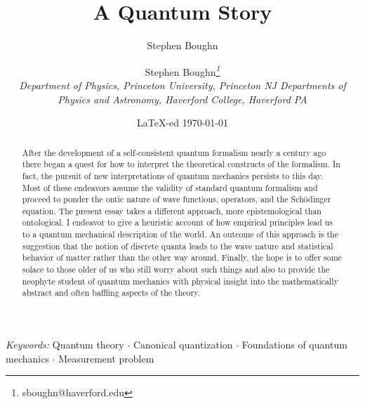 \documentclass[12pt]{article}
\def\\{\hfill\break} \let\==\equiv
\begin{document}
\title{A Quantum Story}
\author {Stephen Boughn{\small\it\thanks{sboughn@haverford.edu}}\author{Stephen Boughn}
\\[2mm]
 \it Department of Physics, Princeton University, Princeton NJ\\
 \it Departments of Physics and Astronomy, Haverford College, Haverford PA}


\date{{\small   \LaTeX-ed \today}}

\maketitle


\begin{abstract}

After the development of a self-consistent quantum formalism nearly a century ago there began a quest for how to interpret the theoretical constructs of the formalism.  In fact, the pursuit of new interpretations of quantum mechanics persists to this day.  Most of these endeavors assume the validity of standard quantum formalism and proceed to ponder the ontic nature of wave functions, operators, and the Sch\"{o}dinger equation. The present essay takes a different approach, more epistemological than ontological. I endeavor to give a heuristic account of how empirical principles lead us to a quantum mechanical description of the world.  An outcome of this approach is the suggestion that the notion of discrete quanta leads to the wave nature and statistical behavior of matter rather than the other way around.  Finally, the hope is to offer some solace to those older of us who still worry about such things and also to provide the neophyte student of quantum mechanics with physical insight into the mathematically abstract and often baffling aspects of the theory.


\end{abstract}

{\it Keywords:} Quantum theory $\cdot$ Canonical quantization $\cdot$ Foundations of quantum mechanics $\cdot$ Measurement problem


\end{document}

